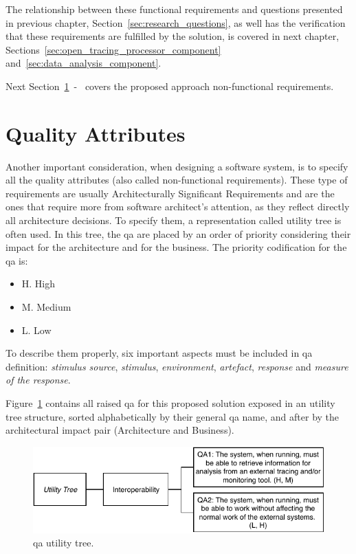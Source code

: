 The relationship between these functional requirements and questions presented in previous chapter, Section~\ref{sec:research_questions}, as well has the verification that these requirements are fulfilled by the solution, is covered in next chapter, Sections~\ref{sec:open_tracing_processor_component} and~\ref{sec:data_analysis_component}.

Next Section~\ref{sec:quality_attributes}~-~ covers the proposed approach non-functional requirements.

\section{Quality Attributes}
\label{sec:quality_attributes}

Another important consideration, when designing a software system, is to specify all the quality attributes (also called non-functional requirements). These type of requirements are usually Architecturally Significant Requirements and are the ones that require more from software architect's attention, as they reflect directly all architecture decisions. To specify them, a representation called utility tree is often used. In this tree, the \gls{qa} are placed by an order of priority considering their impact for the architecture and for the business. The priority codification for the \gls{qa} is:

\begin{itemize}
    \item H. High
    \item M. Medium
    \item L. Low
\end{itemize}

To describe them properly, six important aspects must be included in \gls{qa} definition: \emph{stimulus source}, \emph{stimulus}, \emph{environment}, \emph{artefact}, \emph{response} and \emph{measure of the response}.

Figure~\ref{fig:utility_tree} contains all raised \gls{qa} for this proposed solution exposed in an utility tree structure, sorted alphabetically by their general \gls{qa} name, and after by the architectural impact pair (Architecture and Business).

\begin{figure}[H]
    \centering
    \includegraphics[width=1.00\textwidth]{images/utility_tree.pdf}
    \caption{\gls{qa} utility tree.}
    \label{fig:utility_tree}
\end{figure}

